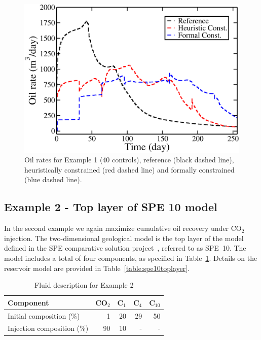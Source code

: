 \documentclass[twocolumn,numbook]{svjour3}          %
\begin{document}
\begin{figure}
\begin{center}
\includegraphics[totalheight=2.2in,angle=0]{OilRatesSteps8.pdf}
\end{center}
\caption{Oil rates for Example 1 (40 controls), reference (black dashed line), heuristically constrained (red dashed line)
 and formally constrained (blue dashed line).} 
\label{fig:PIOilRates}
\end{figure}





\subsection{Example 2 - Top layer of SPE 10 model}
%
In the second example we again maximize cumulative oil recovery under CO$_2$
injection. The two-dimensional geological model is the top layer of the model
defined in the SPE comparative solution project~\cite{Christie}, referred to as
SPE~10. The model includes a total of four components, as specified in
Table~\ref{table:fluidForSPE10TopLayer}. Details on the
reservoir model are provided in
Table~\ref{table:spe10toplayer}.

%
\begin{table}
\centering
\caption{Fluid description for Example 2}
\begin{tabular}{|l|r|r|r|r|}
\hline
Component            & CO$_2$ & C$_1$ & C$_4$ & C$_{10}$    \\
\hline
Initial composition (\%)  & 1    & 20  & 29    & 50 \\
Injection composition (\%)& 90   & 10 & - & - \\
\hline
\end{tabular}
\label{table:fluidForSPE10TopLayer}
\end{table}
%
\end{document}
